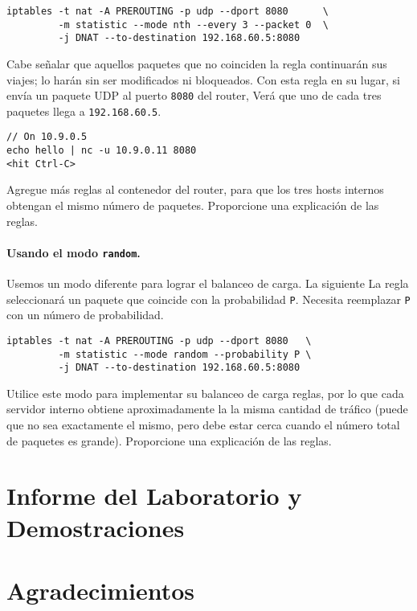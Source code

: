 \begin{lstlisting}
iptables -t nat -A PREROUTING -p udp --dport 8080      \
         -m statistic --mode nth --every 3 --packet 0  \
         -j DNAT --to-destination 192.168.60.5:8080
\end{lstlisting}

Cabe señalar que aquellos paquetes que no coinciden
la regla continuarán sus viajes; lo harán
sin ser modificados ni bloqueados. Con esta regla en su lugar,
si envía un paquete UDP al puerto \texttt{8080} del router,
Verá que uno de cada tres paquetes llega a
\texttt{192.168.60.5}.


\begin{lstlisting}
// On 10.9.0.5
echo hello | nc -u 10.9.0.11 8080
<hit Ctrl-C>
\end{lstlisting}
 
Agregue más reglas al contenedor del router,
para que los tres hosts internos obtengan el mismo
número de paquetes.
Proporcione una explicación de las reglas.


\paragraph{Usando el modo \texttt{random}.}
Usemos un modo diferente para lograr el balanceo de carga. La siguiente
La regla seleccionará un paquete que coincide con la probabilidad \texttt{P}.
Necesita reemplazar \texttt{P} con un número de probabilidad.

\begin{lstlisting}
iptables -t nat -A PREROUTING -p udp --dport 8080   \
         -m statistic --mode random --probability P \
         -j DNAT --to-destination 192.168.60.5:8080
\end{lstlisting}

Utilice este modo para implementar su balanceo de carga
reglas, por lo que cada servidor interno obtiene aproximadamente la
la misma cantidad de tráfico (puede que no sea exactamente el mismo,
pero debe estar cerca cuando el número total de paquetes es grande).
Proporcione una explicación de las reglas.


\section{Informe del Laboratorio y Demostraciones}




\section*{Agradecimientos}








